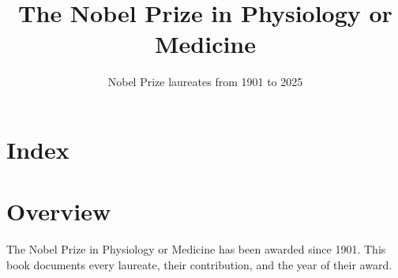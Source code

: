 \documentclass[12pt,a4paper]{book}
\title{The Nobel Prize in Physiology or Medicine}
\author{Nobel Prize laureates from 1901 to 2025}
\date{}
\begin{document}
\maketitle
\tableofcontents
\newpage

\chapter*{Index}
\printindex

\chapter*{Overview}

The Nobel Prize in Physiology or Medicine has been awarded since 1901. This book documents every laureate, their contribution, and the year of their award.
\end{document}
